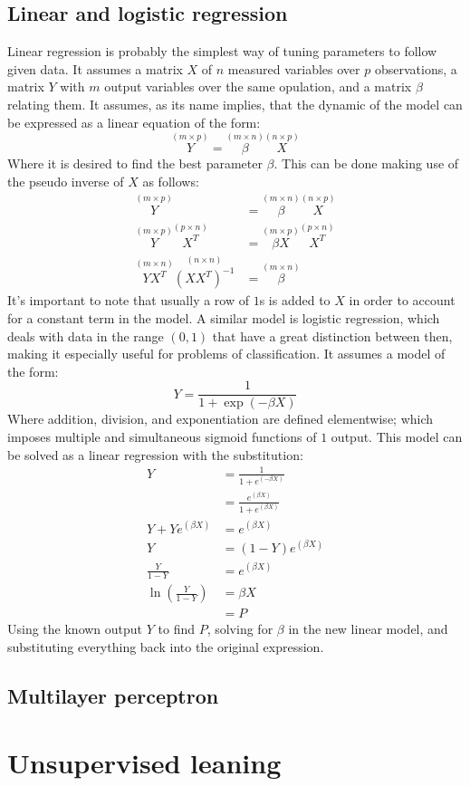\documentclass[journal]{IEEEtran}
\begin{document}
\subsection{Linear and logistic regression\label{sec:regression}}

Linear regression is probably the simplest way of tuning parameters to follow
given data. It assumes a matrix $X$ of $n$ measured variables over $p$
observations, a matrix $Y$ with $m$ output variables over the same opulation,
and a matrix $\beta$ relating them. It assumes, as its name implies, that the
dynamic of the model can be expressed as a linear equation of the form: 
%
\begin{equation}\label{eq:linear}
    \overset{(m\times p)}{Y}
    = \overset{(m\times n)}{\beta} \overset{(n\times p)}{X}
\end{equation}
%
Where it is desired to find the best parameter $\beta$. This can be done making
use of the pseudo inverse of $X$ as follows:
%
\begin{align*}
    \overset{(m\times p)}{Y}
        &= \overset{(m\times n)}{\beta} \overset{(n\times p)}{X}\\
    \overset{(m\times p)}{Y}\overset{(p\times n)}{X^T}
        &= \overset{(m\times p)}{\beta X} \overset{(p\times n)}{X^T}\nonumber\\
    \overset{(m\times n)}{Y X^T} \overset{(n\times n)}{\left(X X^T\right)^{-1}}
        &= \overset{(m\times n)}{\beta}
\end{align*}
%
It's important to note that usually a row of $1$s is added to $X$ in order to
account for a constant term in the model. A similar model is logistic
regression, which deals with data in the range $(0, 1)$ that have a great
distinction between then, making it especially useful for problems of
classification. It assumes a model of the form:
%
\begin{equation}
    Y = \frac{1}{1+\exp{(-\beta X)}}
\end{equation}
%
Where addition, division, and exponentiation are defined elementwise; which
imposes multiple and simultaneous sigmoid functions of $1$ output. 
This model can be solved as a linear regression with the substitution:
%
\begin{align*}
    Y &= \frac{1}{1+e^{(-\beta X)}}\nonumber\\
        &= \frac{e^{(\beta X)}}{1+e^{(\beta X)}}\\
    Y+Ye^{(\beta X)}
        &= e^{(\beta X)}\\
    Y &= (1-Y) e^{(\beta X)}\\
    \frac{Y}{1-Y} &= e^{(\beta X)}\\
    \ln{\left(\frac{Y}{1-Y}\right)} &= \beta X\\
        &= P
\end{align*}
%
Using the known output $Y$ to find $P$, solving for $\beta$ in the new linear
model, and substituting everything back into the original expression.



\subsection{Multilayer perceptron\label{sec:nn}}

\section{Unsupervised leaning\label{sec:unsupervised}}
\printbibliography
\end{document}
